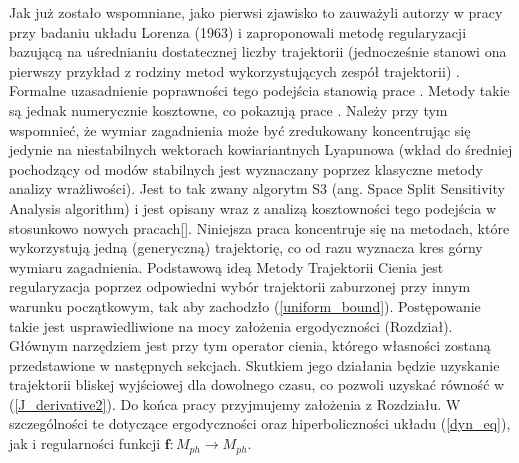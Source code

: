 \documentclass[12pt]{article}
\begin{document}
Jak już zostało wspomniane, jako pierwsi zjawisko to zauważyli autorzy w pracy \cite{Lea1} przy badaniu układu Lorenza (1963) i zaproponowali metodę regularyzacji bazującą na uśrednianiu dostatecznej liczby trajektorii (jednocześnie stanowi ona pierwszy przykład z rodziny metod wykorzystujących zespół trajektorii) \cite{Lea2}. Formalne uzasadnienie poprawności tego podejścia stanowią prace \cite{Ruelle1} . Metody takie są jednak numerycznie kosztowne, co pokazują prace \cite{Chandramoorthy}. Należy przy tym wspomnieć, że wymiar zagadnienia może być zredukowany koncentrując się jedynie na niestabilnych wektorach kowiariantnych Lyapunowa (wkład do średniej pochodzący od modów stabilnych jest wyznaczany poprzez klasyczne metody analizy wrażliwości). Jest to tak zwany algorytm S3 (ang. Space Split Sensitivity Analysis algorithm) i jest opisany wraz z analizą kosztowności tego podejścia w stosunkowo nowych pracach[]. Niniejsza praca koncentruje się na metodach, które wykorzystują jedną (generyczną) trajektorię, co od razu wyznacza kres górny wymiaru zagadnienia.\newline 
Podstawową ideą Metody Trajektorii Cienia jest regularyzacja poprzez odpowiedni wybór trajektorii zaburzonej przy innym warunku początkowym, tak aby zachodzło (\ref{uniform_bound}). Postępowanie takie jest usprawiedliwione na mocy założenia ergodyczności (Rozdział). Głównym narzędziem jest przy tym operator cienia, którego własności zostaną przedstawione w następnych sekcjach. Skutkiem jego działania będzie uzyskanie trajektorii bliskej wyjściowej dla dowolnego czasu, co pozwoli uzyskać równość w (\ref{J_derivative2}). \newline 
Do końca pracy przyjmujemy założenia z Rozdziału. W szczególności te dotyczące ergodyczności oraz hiperboliczności układu (\ref{dyn_eq}), jak i regularności funkcji $ \textbf{f}: M_{ph} \rightarrow M_{ph}$. 
\end{document}
